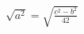 \documentclass[preview]{standalone}
\begin{document}
\begin{align*}
\sqrt{a^2} = \sqrt{\frac{c^2 - b^2}{42}}
\end{align*}
\end{document}
